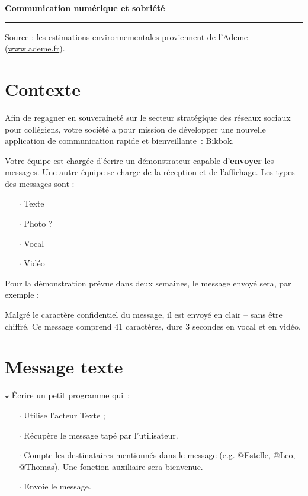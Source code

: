 \documentclass[a4paper]{article}
\begin{document}
\begin{center}
  \Large\bf Communication numérique et sobriété
\end{center}

\noindent\rule{\linewidth}{.6pt}

\bigskip

Source : les estimations environnementales proviennent de l'Ademe (\url{www.ademe.fr}).

\section*{Contexte}

Afin de regagner en souveraineté sur le secteur stratégique des réseaux sociaux pour collégiens, votre société a pour mission de développer une nouvelle application de communication rapide et bienveillante~: Bikbok.

Votre équipe est chargée d'écrire un démonstrateur capable d'\textbf{envoyer} les messages. Une autre équipe se charge de la réception et de l'affichage. Les types des messages sont :

\begin{itemize}[itemsep=0.2ex]
\item[$\cdot$] Texte
\item[$\cdot$] Photo ?
\item[$\cdot$] Vocal
\item[$\cdot$] Vidéo
\end{itemize}

Pour la démonstration prévue dans deux semaines, le message envoyé sera, par exemple :

\smallskip
\centerline{}
\smallskip

Malgré le caractère confidentiel du message, il  est envoyé en clair -- sans être chiffré. Ce message comprend 41 caractères, dure 3 secondes en vocal et en vidéo.

\section{Message texte}

$\star$ Écrire un petit programme qui~:

\begin{itemize}[itemsep=0.2ex]
\item[$\cdot$] Utilise l'acteur Texte ;
\item[$\cdot$] Récupère le message tapé par l'utilisateur.
\item[$\cdot$] Compte les destinataires mentionnés dans le message (e.g. @Estelle, @Leo, @Thomas). Une fonction auxiliaire sera bienvenue.
\item[$\cdot$] Envoie le message.
\end{itemize}
\end{document}
